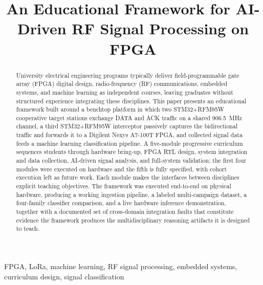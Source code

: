 \documentclass[conference]{IEEEtran}
\begin{document}
\title{An Educational Framework for AI-Driven RF Signal Processing on FPGA}

\author{
}

\maketitle

\begin{abstract}
University electrical engineering programs typically deliver field-programmable gate array (FPGA) digital design, radio-frequency (RF) communications, embedded systems, and machine learning as independent courses, leaving graduates without structured experience integrating these disciplines. This paper presents an educational framework built around a benchtop platform in which two STM32+RFM95W cooperative target stations exchange DATA and ACK traffic on a shared 906.5~MHz channel, a third STM32+RFM95W interceptor passively captures the bidirectional traffic and forwards it to a Digilent Nexys A7-100T FPGA, and collected signal data feeds a machine learning classification pipeline. A five-module progressive curriculum sequences students through hardware bring-up, FPGA RTL design, system integration and data collection, AI-driven signal analysis, and full-system validation; the first four modules were executed on hardware and the fifth is fully specified, with cohort execution left as future work. Each module makes the interfaces between disciplines explicit teaching objectives. The framework was executed end-to-end on physical hardware, producing a working ingestion pipeline, a labeled multi-campaign dataset, a four-family classifier comparison, and a live hardware inference demonstration, together with a documented set of cross-domain integration faults that constitute evidence the framework produces the multidisciplinary reasoning artifacts it is designed to teach. %
\end{abstract}

\begin{IEEEkeywords}
FPGA, LoRa, machine learning, RF signal processing, embedded systems, curriculum design, signal classification
\end{IEEEkeywords}
\end{document}

